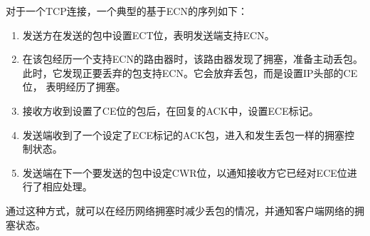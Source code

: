 对于一个TCP连接，一个典型的基于ECN的序列如下：
\begin{enumerate}
  \item 发送方在发送的包中设置ECT位，表明发送端支持ECN。
  \item 在该包经历一个支持ECN的路由器时，该路由器发现了拥塞，准备主动丢包。
    此时，它发现正要丢弃的包支持ECN。它会放弃丢包，而是设置IP头部的CE位，
    表明经历了拥塞。
  \item 接收方收到设置了CE位的包后，在回复的ACK中，设置ECE标记。
  \item 发送端收到了一个设定了ECE标记的ACK包，进入和发生丢包一样的拥塞控制状态。
  \item 发送端在下一个要发送的包中设定CWR位，以通知接收方它已经对ECE位进行了相应处理。
\end{enumerate}

通过这种方式，就可以在经历网络拥塞时减少丢包的情况，并通知客户端网络的拥塞状态。
